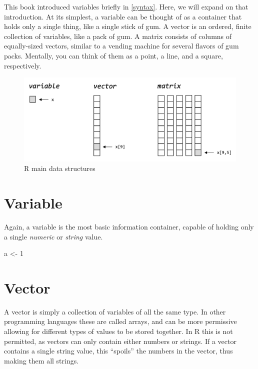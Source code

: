 \documentclass[
]{book}
\newenvironment{Shaded}{\begin{snugshade}}{\end{snugshade}}
\newcommand{\DecValTok}[1]{\textcolor[rgb]{0.00,0.00,0.81}{#1}}
\newcommand{\NormalTok}[1]{#1}
\newcommand{\OtherTok}[1]{\textcolor[rgb]{0.56,0.35,0.01}{#1}}
\begin{document}
\hfill\break

This book introduced variables briefly in \ref{syntax}. Here, we will expand on that introduction. At its simplest, a variable can be thought of as a container that holds only a single thing, like a single stick of gum. A vector is an ordered, finite collection of variables, like a pack of gum. A matrix consists of columns of equally-sized vectors, similar to a vending machine for several flavors of gum packs. Mentally, you can think of them as a point, a line, and a square, respectively.

\begin{figure}

{\centering \includegraphics[width=0.67\linewidth]{images/04_001_data_structures} 

}

\caption{\label{fig:4001}R main data structures}\label{fig:4001}
\end{figure}

\hypertarget{variable}{%
\section{Variable}\label{variable}}

Again, a variable is the most basic information container, capable of holding only a single \emph{numeric} or \emph{string} value.

\begin{Shaded}
\begin{Highlighting}[]
\NormalTok{a }\OtherTok{\textless{}{-}} \DecValTok{1}
\end{Highlighting}
\end{Shaded}

\hypertarget{vector}{%
\section{Vector}\label{vector}}

A vector is simply a collection of variables of all the same type. In other programming languages these are called arrays, and can be more permissive allowing for different types of values to be stored together. In R this is not permitted, as vectors can only contain either numbers or strings. If a vector contains a single string value, this ``spoils'' the numbers in the vector, thus making them all strings.
\end{document}
